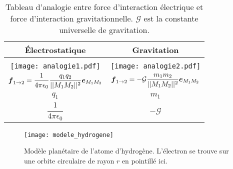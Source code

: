 \begin{table}[h!]
	\centering
	\caption{Tableau d'analogie entre force d'interaction électrique et 
	force d'interaction gravitationnelle. $\mathcal{G}$ est la constante 
	universelle de gravitation.}
	\label{tab:analogie}
	\begin{tabular}{c|c}
		Électrostatique 	&	Gravitation \\[1em] \hline \\[0.5em]
		\texttt{[image: analogie1.pdf]} & \texttt{[image: analogie2.pdf]} \\[2em]
		$\vecf_{1 \rightarrow 2} = \dfrac{1}{4\pi\epsilon_0}
	                                  \dfrac{q_1 q_2}{||M_1M_2||^2}
					  \mitbf{e}_{M_1M_2}$
					& $\vecf_{1 \rightarrow 2} = - \mathcal{G}
	                                  \dfrac{m_1 m_2}{||M_1M_2||^2}
					  \mitbf{e}_{M_1M_2}$ \\[1em]
		$q_1$			&	$m_1$ \\[1em]
		$\dfrac{1}{4 \pi \epsilon_0}$		&	$-\mathcal{G}$\\
	\end{tabular}
\end{table}

\begin{figure}[h!]
	\centering
	\texttt{[image: modele\_hydrogene]}
	\caption{Modèle planétaire de l'atome d'hydrogène. L'électron 
	se trouve sur une orbite circulaire de rayon $r$ en pointillé ici.}%
	\label{fig:hydrogene}
\end{figure}

